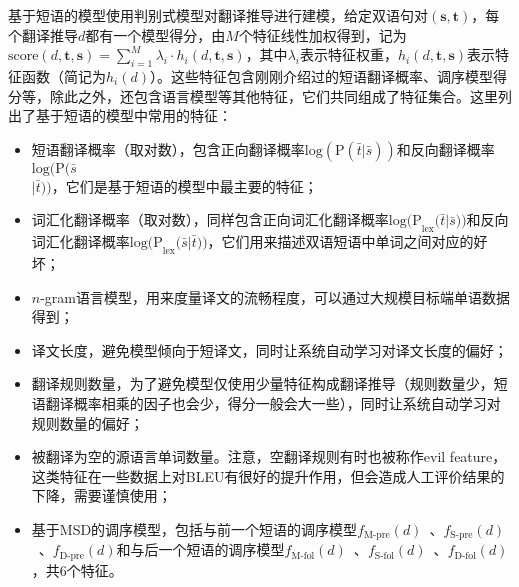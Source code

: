 \parinterval 基于短语的模型使用判别式模型对翻译推导进行建模，给定双语句对$(\mathbf{s},\mathbf{t})$，每个翻译推导$d$都有一个模型得分，由$M$个特征线性加权得到，记为$\textrm{score}(d,\mathbf{t},\mathbf{s}) = \sum_{i=1}^{M} \lambda_i \cdot h_i (d,\mathbf{t},\mathbf{s})$，其中$\lambda_i$表示特征权重，$h_i (d,\mathbf{t},\mathbf{s})$表示特征函数（简记为$h_i (d)$）。这些特征包含刚刚介绍过的短语翻译概率、调序模型得分等，除此之外，还包含语言模型等其他特征，它们共同组成了特征集合。这里列出了基于短语的模型中常用的特征：

\begin{itemize}
\vspace{0.5em}
\item 短语翻译概率（取对数），包含正向翻译概率$\textrm{log}(\textrm{P}(\bar{t}|\bar{s}))$和反向翻译概率$\textrm{log}(\textrm{P}(\bar{s}$\\$|\bar{t}))$，它们是基于短语的模型中最主要的特征；
\vspace{0.5em}
\item 词汇化翻译概率（取对数），同样包含正向词汇化翻译概率$\textrm{log(P}_{\textrm{lex}}(\bar{t}|\bar{s}\textrm{))}$和反向词汇化翻译概率$\textrm{log(P}_{\textrm{lex}}(\bar{s}|\bar{t}\textrm{))}$，它们用来描述双语短语中单词之间对应的好坏；
\vspace{0.5em}
\item $n$-gram语言模型，用来度量译文的流畅程度，可以通过大规模目标端单语数据得到；
\vspace{0.5em}
\item 译文长度，避免模型倾向于短译文，同时让系统自动学习对译文长度的偏好；
\vspace{0.5em}
\item 翻译规则数量，为了避免模型仅使用少量特征构成翻译推导（规则数量少，短语翻译概率相乘的因子也会少，得分一般会大一些），同时让系统自动学习对规则数量的偏好；
\vspace{0.5em}
\item 被翻译为空的源语言单词数量。注意，空翻译规则有时也被称作evil feature，这类特征在一些数据上对BLEU有很好的提升作用，但会造成人工评价结果的下降，需要谨慎使用；
\vspace{0.5em}
\item 基于MSD的调序模型，包括与前一个短语的调序模型$f_{\textrm{M-pre}}(d)$\ 、$f_{\textrm{S-pre}}(d)$\ 、$f_{\textrm{D-pre}}(d)$和与后一个短语的调序模型$f_{\textrm{M-fol}}(d)$\ 、$f_{\textrm{S-fol}}(d)$\ 、$f_{\textrm{D-fol}}(d)$，共6个特征。
\vspace{0.5em}
\end{itemize}

